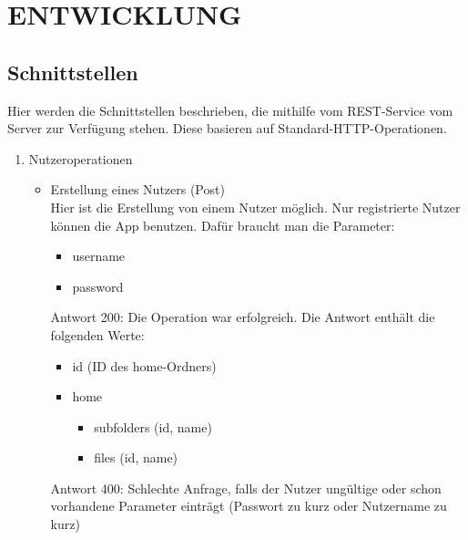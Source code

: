 \section{\uppercase{Entwicklung}}
\subsection{Schnittstellen}
Hier werden die Schnittstellen beschrieben, die mithilfe vom REST-Service vom Server zur Verf\"ugung stehen. Diese basieren auf Standard-HTTP-Operationen.
\begin{enumerate}
\item Nutzeroperationen
\begin{itemize}
\item Erstellung eines Nutzers (Post)\\
Hier ist die Erstellung von einem Nutzer m\"oglich. Nur registrierte Nutzer k\"onnen die App benutzen. Daf\"ur braucht man die Parameter: 
\begin{itemize}
\item username 
\item password
\end{itemize}
Antwort 200: Die Operation war erfolgreich. Die Antwort enth\"alt die folgenden Werte:
\begin{itemize}
\item id (ID des home-Ordners)
\item home
	\begin{itemize}
	\item subfolders (id, name)
	\item files (id, name)
	\end{itemize}
\end{itemize}

Antwort 400: Schlechte Anfrage, falls der Nutzer ung\"ultige oder schon vorhandene Parameter eintr\"agt (Passwort zu kurz oder Nutzername zu kurz)


\end{itemize}
\end{enumerate}
